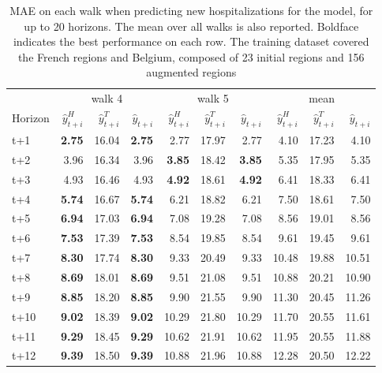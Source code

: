 \begin{table}[H]
\centering
\caption{MAE on each walk when predicting new hospitalizations for the model, for up to 20 horizons. The mean over all walks is also reported. Boldface indicates the best performance on each row. The training dataset covered the French regions and Belgium, composed of 23 initial regions and 156 augmented regions }
\label{tab:MAE_walk_assemble}
\begin{tabular}{lrrrrrrrrr}
\toprule
 & \multicolumn{3}{c}{walk 4} & \multicolumn{3}{c}{walk 5} & \multicolumn{3}{c}{mean} 
\\

\cmidrule(lr){2-4} \cmidrule(lr){5-7} \cmidrule(lr){8-10} 
Horizon & $\hat{y}_{t+i}^H$ & $\hat{y}_{t+i}^T$ & $\hat{y}_{t+i}$ & $\hat{y}_{t+i}^H$ & $\hat{y}_{t+i}^T$ & $\hat{y}_{t+i}$ & $\hat{y}_{t+i}^H$ & $\hat{y}_{t+i}^T$ & $\hat{y}_{t+i}$ \\
\midrule
t+1  & \textbf{2.75}  & 16.04  & \textbf{2.75}  & 2.77  & 17.97  & 2.77  & 4.10  & 17.23  & 4.10  \\
t+2  & 3.96  & 16.34  & 3.96  & \textbf{3.85}  & 18.42  & \textbf{3.85}  & 5.35  & 17.95  & 5.35  \\
t+3  & 4.93  & 16.46  & 4.93  & \textbf{4.92}  & 18.61  & \textbf{4.92}  & 6.41  & 18.33  & 6.41  \\
t+4  & \textbf{5.74}  & 16.67  & \textbf{5.74}  & 6.21  & 18.82  & 6.21  & 7.50  & 18.61  & 7.50  \\
t+5  & \textbf{6.94}  & 17.03  & \textbf{6.94}  & 7.08  & 19.28  & 7.08  & 8.56  & 19.01  & 8.56  \\
t+6  & \textbf{7.53}  & 17.39  & \textbf{7.53}  & 8.54  & 19.85  & 8.54  & 9.61  & 19.45  & 9.61  \\
t+7  & \textbf{8.30}  & 17.74  & \textbf{8.30}  & 9.33  & 20.49  & 9.33  & 10.48  & 19.88  & 10.51  \\
t+8  & \textbf{8.69}  & 18.01  & \textbf{8.69}  & 9.51  & 21.08  & 9.51  & 10.88  & 20.21  & 10.90  \\
t+9  & \textbf{8.85}  & 18.20  & \textbf{8.85}  & 9.90  & 21.55  & 9.90  & 11.30  & 20.45  & 11.26  \\
t+10  & \textbf{9.02}  & 18.39  & \textbf{9.02}  & 10.29  & 21.80  & 10.29  & 11.70  & 20.55  & 11.61  \\
t+11  & \textbf{9.29}  & 18.45  & \textbf{9.29}  & 10.62  & 21.91  & 10.62  & 11.95  & 20.55  & 11.88  \\
t+12  & \textbf{9.39}  & 18.50  & \textbf{9.39}  & 10.88  & 21.96  & 10.88  & 12.28  & 20.50  & 12.22  \\

\end{tabular}
\end{table}
